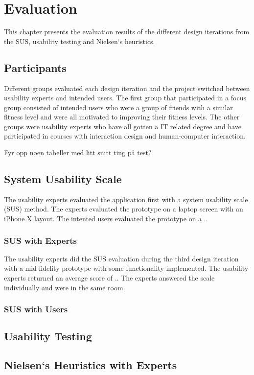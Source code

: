 \chapter{Evaluation}
This chapter presents the evaluation results of the different design iterations from the SUS, usability testing and Nielsen`s heuristics.

\section{Participants}
Different groups evaluated each design iteration and the project switched between usability experts and intended users. The first group that participated in a focus group consisted of intended users who were a group of friends with a similar fitness level and were all motivated to improving their fitness levels. The other groups were usability experts who have all gotten a IT related degree and have participated in courses with interaction design and human-computer interaction.

Fyr opp noen tabeller med litt snitt ting på test?

\section{System Usability Scale}
The usability experts evaluated the application first with a system usability scale (SUS) method. The experts evaluated the prototype on a laptop screen with an iPhone X layout. The intented users evaluated the prototype on a ..

\subsection{SUS with Experts}
The usability experts did the SUS evaluation during the third design iteration with a mid-fidelity prototype with some functionality implemented. The usability experts returned an average score of .. The experts answered the scale individually and were in the same room.
\subsection{SUS with Users}

\section{Usability Testing}
\section{Nielsen`s Heuristics with Experts}
